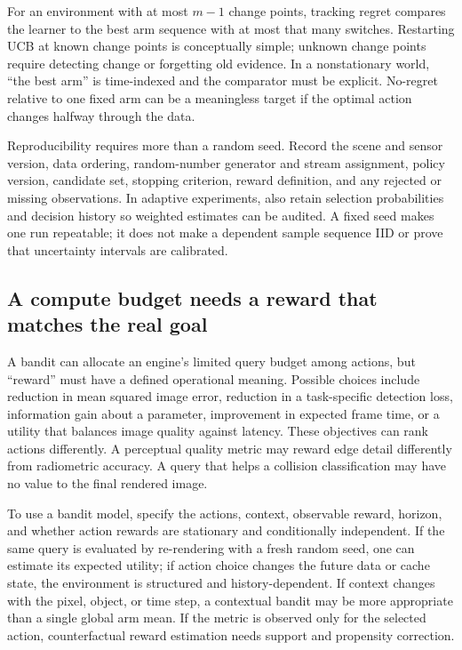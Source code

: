 For an environment with at most \(m-1\) change points, tracking regret compares the learner to the best arm sequence with at most that many switches. Restarting UCB at known change points is conceptually simple; unknown change points require detecting change or forgetting old evidence. In a nonstationary world, ``the best arm'' is time-indexed and the comparator must be explicit. No-regret relative to one fixed arm can be a meaningless target if the optimal action changes halfway through the data.

Reproducibility requires more than a random seed. Record the scene and sensor version, data ordering, random-number generator and stream assignment, policy version, candidate set, stopping criterion, reward definition, and any rejected or missing observations. In adaptive experiments, also retain selection probabilities and decision history so weighted estimates can be audited. A fixed seed makes one run repeatable; it does not make a dependent sample sequence IID or prove that uncertainty intervals are calibrated.

\subsection{A compute budget needs a reward that matches the real goal}\label{03-visual-computing-i-ch012-a-compute-budget-needs-a-reward-that-matches-the-real-goal}

A bandit can allocate an engine's limited query budget among actions, but ``reward'' must have a defined operational meaning. Possible choices include reduction in mean squared image error, reduction in a task-specific detection loss, information gain about a parameter, improvement in expected frame time, or a utility that balances image quality against latency. These objectives can rank actions differently. A perceptual quality metric may reward edge detail differently from radiometric accuracy. A query that helps a collision classification may have no value to the final rendered image.

To use a bandit model, specify the actions, context, observable reward, horizon, and whether action rewards are stationary and conditionally independent. If the same query is evaluated by re-rendering with a fresh random seed, one can estimate its expected utility; if action choice changes the future data or cache state, the environment is structured and history-dependent. If context changes with the pixel, object, or time step, a contextual bandit may be more appropriate than a single global arm mean. If the metric is observed only for the selected action, counterfactual reward estimation needs support and propensity correction.

